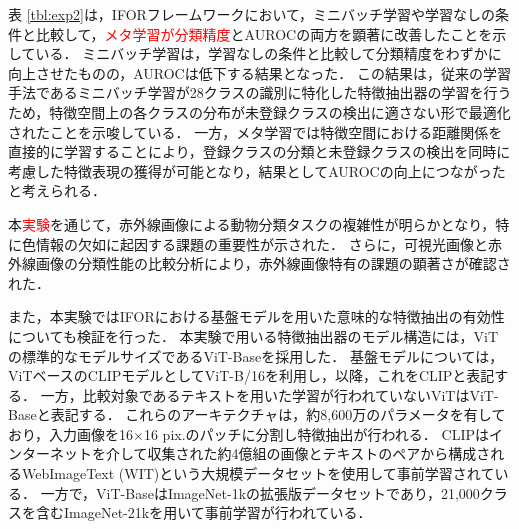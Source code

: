 \documentclass[a4paper,11pt,nomag]{jsreport}
\begin{document}
表 \ref{tbl:exp2}は，IFORフレームワークにおいて，ミニバッチ学習や学習なしの条件と比較して，\textcolor{red}{メタ学習が分類精度}とAUROCの両方を顕著に改善したことを示している．
ミニバッチ学習は，学習なしの条件と比較して分類精度をわずかに向上させたものの，AUROCは低下する結果となった．
この結果は，従来の学習手法であるミニバッチ学習が28クラスの識別に特化した特徴抽出器の学習を行うため，特徴空間上の各クラスの分布が未登録クラスの検出に適さない形で最適化されたことを示唆している．
一方，メタ学習では特徴空間における距離関係を直接的に学習することにより，登録クラスの分類と未登録クラスの検出を同時に考慮した特徴表現の獲得が可能となり，結果としてAUROCの向上につながったと考えられる．

本\textcolor{red}{実験}を通じて，赤外線画像による動物分類タスクの複雑性が明らかとなり，特に色情報の欠如に起因する課題の重要性が示された．
さらに，可視光画像と赤外線画像の分類性能の比較分析により，赤外線画像特有の課題の顕著さが確認された．

また，本{実験}ではIFORにおける基盤モデルを用いた意味的な特徴抽出の有効性についても検証を行った．
本実験で用いる特徴抽出器のモデル構造には，ViTの標準的なモデルサイズであるViT-Baseを採用した．
基盤モデルについては，ViTベースのCLIPモデルとしてViT-B/16を利用し，以降，これをCLIPと表記する．
一方，比較対象であるテキストを用いた学習が行われていないViTはViT-Baseと表記する．
これらのアーキテクチャは，約8,600万のパラメータを有しており，入力画像を16$\times$16 pix.のパッチに分割し特徴抽出が行われる．
CLIPはインターネットを介して収集された約4億組の画像とテキストのペアから構成されるWebImageText (WIT)という大規模データセットを使用して事前学習されている．
一方で，ViT-BaseはImageNet-1kの拡張版データセットであり，21,000クラスを含むImageNet-21kを用いて事前学習が行われている．
\end{document}
